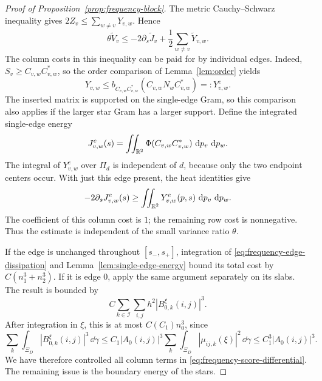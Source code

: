 \begin{proof}[Proof of Proposition~\ref{prop:frequency-block}]
The metric Cauchy--Schwarz inequality gives
$2Z_v\leq\sum_{w\ne v}Y_{v,w}$.  Hence
\begin{equation}\label{eq:frequency-score-differential}
 \theta\widetilde V_v
 \leq-2\partial_s\widetilde J_v
                         +\frac12\sum_{w\ne v}\widetilde Y_{v,w}.
\end{equation}
The column costs in this inequality can be paid for by individual
edges.  Indeed, $S_v\geq C_{v,w}C_{v,w}^*$, so the order comparison
of Lemma~\ref{lem:order} yields
\begin{equation}\label{eq:frequency-edge-cost}
 Y_{v,w}\leq
 b_{C_{v,w}C_{v,w}^*}(C_{v,w}N_wC_{v,w}^*)=:Y^e_{v,w}.
\end{equation}
The inserted matrix is supported on the single-edge Gram, so this
comparison also applies if the larger star Gram has a larger
support.  Define the integrated single-edge energy
\[
 J^e_{v,w}(s)=\iint_{\mathbb R^2}
                  \Phi(C_{v,w}C_{v,w}^*)\,\,\mathrm d p_v\,\,\mathrm d p_w.
\]
The integral of $Y^e_{v,w}$ over $\Pi_d$ is independent of $d$,
because only the two endpoint centers occur.  With just this edge
present, the heat identities give
\begin{equation}\label{eq:frequency-edge-dissipation}
 -2\partial_sJ^e_{v,w}(s)
 \geq\iint_{\mathbb R^2}Y^e_{v,w}(p,s)\,\,\mathrm d p_v\,\,\mathrm d p_w.
\end{equation}
The coefficient of this column cost is $1$; the remaining row cost
is nonnegative.  Thus the estimate is independent of the small
variance ratio $\theta$.

If the edge is unchanged throughout $[s_-,s_+]$, integration of
\eqref{eq:frequency-edge-dissipation} and
Lemma~\ref{lem:single-edge-energy} bound its total cost by
$C(n_1^3+n_2^3)$.  If it is edge $0$, apply the same argument
separately on its slabs.  The result is bounded by
\[
 C\sum_{k\in\mathcal I}\sum_{i,j}h^2
                         |B_{0,k}^\xi(i,j)|^3.
\]
After integration in $\xi$, this is at most $C(C_1)n_0^3$, since
\begin{equation}\label{eq:frequency-cubic-summation}
 \sum_k\int_{\Xi_D}|B_{0,k}^\xi(i,j)|^3\,\dd\gamma
 \leq C_1|A_0(i,j)|^3
       \sum_k\int_{\Xi_D}|\mu_{ij,k}(\xi)|^2\,\dd\gamma
 \leq C_1^3|A_0(i,j)|^3.
\end{equation}
We have therefore controlled all column terms in
\eqref{eq:frequency-score-differential}.  The remaining issue is
the boundary energy of the stars.


\end{proof}
